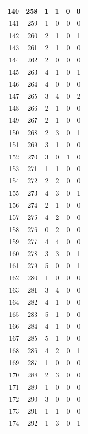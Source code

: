 \documentclass[
  letterpaper,
  DIV=11,
  numbers=noendperiod]{scrreprt}
\begin{document}
\begin{tabular}{r|r|r|r|r|r}
\hline
140 & 258 & 1 & 1 & 0 & 0\\
\hline
141 & 259 & 1 & 0 & 0 & 0\\
\hline
142 & 260 & 2 & 1 & 0 & 1\\
\hline
143 & 261 & 2 & 1 & 0 & 0\\
\hline
144 & 262 & 2 & 0 & 0 & 0\\
\hline
145 & 263 & 4 & 1 & 0 & 1\\
\hline
146 & 264 & 4 & 0 & 0 & 0\\
\hline
147 & 265 & 3 & 4 & 0 & 2\\
\hline
148 & 266 & 2 & 1 & 0 & 0\\
\hline
149 & 267 & 2 & 1 & 0 & 0\\
\hline
150 & 268 & 2 & 3 & 0 & 1\\
\hline
151 & 269 & 3 & 1 & 0 & 0\\
\hline
152 & 270 & 3 & 0 & 1 & 0\\
\hline
153 & 271 & 1 & 1 & 0 & 0\\
\hline
154 & 272 & 2 & 2 & 0 & 0\\
\hline
155 & 273 & 4 & 3 & 0 & 1\\
\hline
156 & 274 & 2 & 1 & 0 & 0\\
\hline
157 & 275 & 4 & 2 & 0 & 0\\
\hline
158 & 276 & 0 & 2 & 0 & 0\\
\hline
159 & 277 & 4 & 4 & 0 & 0\\
\hline
160 & 278 & 3 & 3 & 0 & 1\\
\hline
161 & 279 & 5 & 0 & 0 & 1\\
\hline
162 & 280 & 1 & 0 & 0 & 0\\
\hline
163 & 281 & 3 & 4 & 0 & 0\\
\hline
164 & 282 & 4 & 1 & 0 & 0\\
\hline
165 & 283 & 5 & 1 & 0 & 0\\
\hline
166 & 284 & 4 & 1 & 0 & 0\\
\hline
167 & 285 & 5 & 1 & 0 & 0\\
\hline
168 & 286 & 4 & 2 & 0 & 1\\
\hline
169 & 287 & 1 & 0 & 0 & 0\\
\hline
170 & 288 & 2 & 3 & 0 & 0\\
\hline
171 & 289 & 1 & 0 & 0 & 0\\
\hline
172 & 290 & 3 & 0 & 0 & 0\\
\hline
173 & 291 & 1 & 1 & 0 & 0\\
\hline
174 & 292 & 1 & 3 & 0 & 1\\

\end{tabular}
\end{document}
